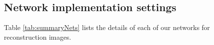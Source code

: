 \FloatBarrier

\subsection{Network implementation settings}

Table \ref{tab:summaryNets} lists the details of each of our networks for reconstruction images.

\begin{table}[!htb]
\caption[Implementation details of each network]{Implementation details of each proposed network.}
\label{tab:summaryNets}
\begin{center}
\end{center}
\end{table}

\FloatBarrier


